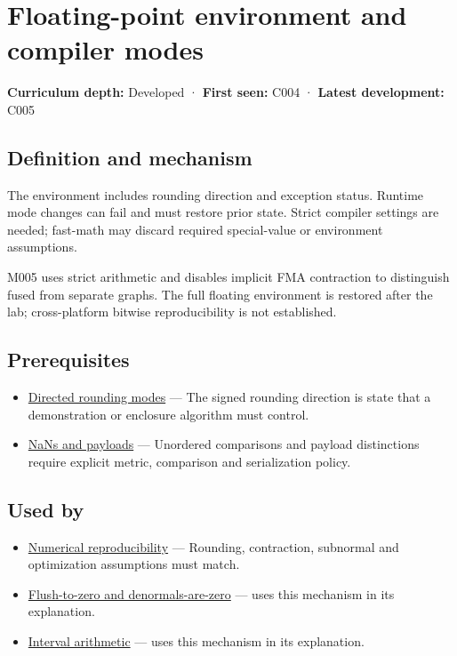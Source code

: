 \hypertarget{appendix-f11d1a521253}{}
\section{Floating-point environment and compiler modes}\label{appendix-f11d1a521253-floating-point-environment-and-compiler-modes}

\textbf{Curriculum depth:} Developed · \textbf{First seen:} C004 · \textbf{Latest development:} C005

\subsection{Definition and mechanism}\label{appendix-f11d1a521253-definition-and-mechanism}

The environment includes rounding direction and exception status. Runtime mode changes can fail and must restore prior state. Strict compiler settings are needed; fast-math may discard required special-value or environment assumptions.

M005 uses strict arithmetic and disables implicit FMA contraction to distinguish fused from separate graphs. The full floating environment is restored after the lab; cross-platform bitwise reproducibility is not established.

\subsection{Prerequisites}\label{appendix-f11d1a521253-prerequisites}

\begin{itemize}
\tightlist
\item
  \hyperref[appendix-637d164ae5ca]{Directed rounding modes} --- The signed rounding direction is state that a demonstration or enclosure algorithm must control.
\item
  \hyperref[appendix-d6607cc4c235]{NaNs and payloads} --- Unordered comparisons and payload distinctions require explicit metric, comparison and serialization policy.
\end{itemize}

\subsection{Used by}\label{appendix-f11d1a521253-used-by}

\begin{itemize}
\item
  \hyperref[appendix-5f1a2c3f97ff]{Numerical reproducibility} --- Rounding, contraction, subnormal and optimization assumptions must match.
\item
  \hyperref[appendix-e979eb012782]{Flush-to-zero and denormals-are-zero} --- uses this mechanism in its explanation.
\item
  \hyperref[appendix-1823a14330cb]{Interval arithmetic} --- uses this mechanism in its explanation.
\end{itemize}

